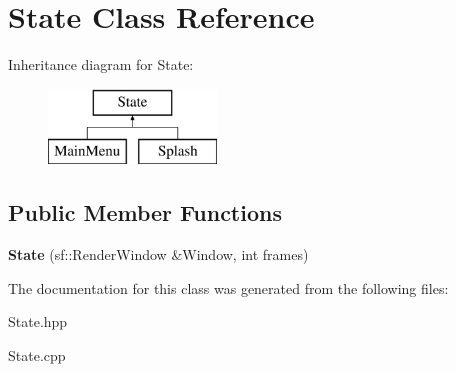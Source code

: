 \hypertarget{class_state}{\section{State Class Reference}
\label{class_state}
}
Inheritance diagram for State\-:\begin{figure}[H]
\begin{center}
\leavevmode
\includegraphics[height=2.000000cm]{class_state}
\end{center}
\end{figure}
\subsection*{Public Member Functions}
\begin{DoxyCompactItemize}
\item 
\hypertarget{class_state_a0084b959e9435631dee76073044434e6}{{\bfseries State} (sf\-::\-Render\-Window \&Window, int frames)}\label{class_state_a0084b959e9435631dee76073044434e6}

\end{DoxyCompactItemize}


The documentation for this class was generated from the following files\-:\begin{DoxyCompactItemize}
\item 
State.\-hpp\item 
State.\-cpp\end{DoxyCompactItemize}
